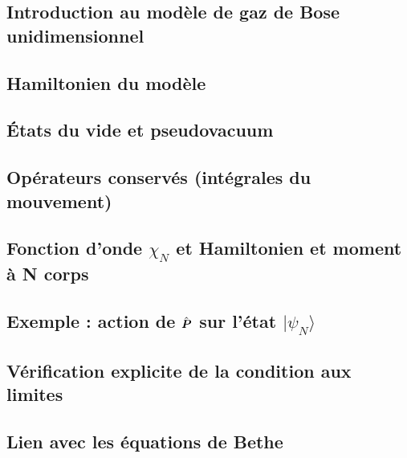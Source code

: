 \subsection{Introduction au modèle de gaz de Bose unidimensionnel}


\subsection{Hamiltonien du modèle}


\subsection{États du vide et pseudovacuum}



\subsection{Opérateurs conservés (intégrales du mouvement)}

 
\subsection{Fonction d’onde $\chi_N$ et Hamiltonien et moment à N corps}


\subsection{Exemple : action de $\hat{\bm{P}}$ sur l’état $\vert \psi_N\rangle$}


\subsection{Vérification explicite de la condition aux limites}




\subsection{Lien avec les équations de Bethe}




